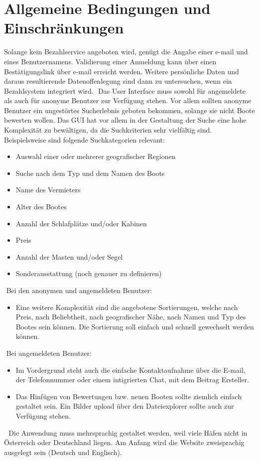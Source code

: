 \documentclass[12pt]{article}
\theoremstyle{definition}
\begin{document}
\section{Allgemeine Bedingungen und Einschränkungen}
Solange kein Bezahlservice angeboten wird, genügt die Angabe einer e-mail und eines Benutzernamens. Validierung einer Anmeldung kann über einen Bestätigungslink über e-mail erreicht werden. Weitere persönliche Daten und daraus resultierende Datenoffenlegung sind dann zu untersuchen, wenn ein Bezahlsystem integriert wird.
​
Das User Interface muss sowohl für angemeldete als auch für anonyme Benutzer zur Verfügung stehen. Vor allem sollten anonyme Benutzer ein ungestörtes Sucherlebnis geboten bekommen, solange sie nicht Boote bewerten wollen. Das GUI hat vor allem in der Gestaltung der Suche eine hohe Komplexität zu bewältigen, da die Suchkriterien sehr vielfältig sind. Beispielsweise sind folgende Suchkategorien relevant:
​
\begin{itemize}
   \item Auswahl einer oder mehrerer geografischer Regionen
   \item Suche nach dem Typ und dem Namen des Boots
   \item Name des Vermieters
   \item Alter des Bootes
   \item Anzahl der Schlafplätze und/oder Kabinen
   \item Preis
   \item Anzahl der Masten und/oder Segel
   \item Sonderausstattung (noch genauer zu definieren)
\end{itemize}
​
Bei den anonymen und angemeldeten Benutzer:
\begin{itemize}
   \item Eine weitere Komplexität sind die angebotene Sortierungen, welche nach Preis, nach Beliebtheit, nach geografischer Nähe, nach Namen und Typ des Bootes sein können. Die Sortierung soll einfach und schnell gewechselt werden können.
\end{itemize}
​
Bei angemeldeten Benutzer:
​
\begin{itemize}
   \item Im Vordergrund steht auch die einfache Kontaktaufnahme über die E-mail, der Telefonnummer oder einem intigrierten Chat, mit dem Beitrag Ersteller.
​
   \item Das Hinfügen von Bewertungen bzw. neuen Booten sollte ziemlich einfach gestaltet sein. Ein Bilder upload über den Dateiexplorer sollte auch zur Verfügung stehen.
\end{itemize}
​
​
Die Anwendung muss mehrsprachig gestaltet werden, weil viele Häfen nicht in Österreich oder Deutschland liegen. Am Anfang wird die Website zweisprachig ausgelegt sein (Deutsch und Englisch).
​
\pagebreak
​
\end{document}
